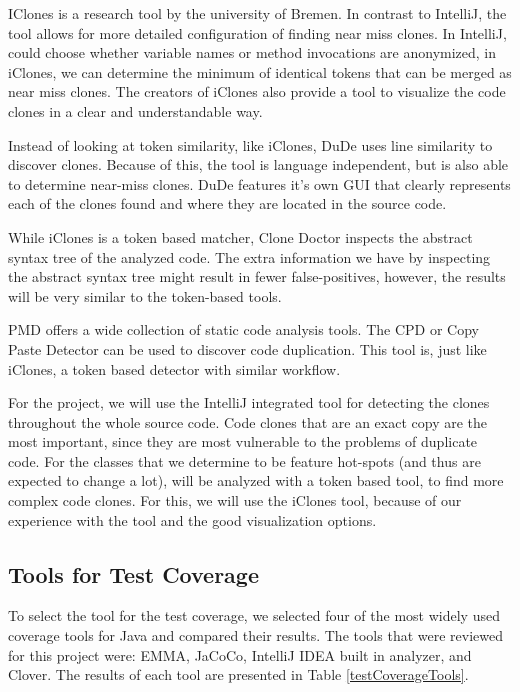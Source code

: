 \documentclass[]{article}
\begin{document}
IClones is a research tool by the university of Bremen. In contrast to IntelliJ, the tool allows for more detailed configuration of finding near miss clones. In IntelliJ, could choose whether variable names or method invocations are anonymized, in iClones, we can determine the minimum of identical tokens that can be merged as near miss clones. The creators of iClones also provide a tool to visualize the code clones in a clear and understandable way.

Instead of looking at token similarity, like iClones, DuDe uses line similarity to discover clones. Because of this, the tool is language independent, but is also able to determine near-miss clones. DuDe features it's own GUI that clearly represents each of the clones found and where they are located in the source code.

While iClones is a token based matcher, Clone Doctor inspects the abstract syntax tree of the analyzed code. The extra information we have by inspecting the abstract syntax tree might result in fewer false-positives, however, the results will be very similar to the token-based tools. 

PMD offers a wide collection of static code analysis tools. The CPD or Copy Paste Detector can be used to discover code duplication. This tool is, just like iClones, a token based detector with similar workflow. 

For the project, we will use the IntelliJ integrated tool for detecting the clones throughout the whole source code. Code clones that are an exact copy are the most important, since they are most vulnerable to the problems of duplicate code. For the classes that we determine to be feature hot-spots (and thus are expected to change a lot), will be analyzed with a token based tool, to find more complex code clones. For this, we will use the iClones tool, because of our experience with the tool and the good visualization options.





\subsection{Tools for Test Coverage}
To select the tool for the test coverage, we selected four of the most widely used coverage tools for Java and compared their results. The tools that were reviewed for this project were: EMMA, JaCoCo, IntelliJ IDEA built in analyzer, and Clover. The results of each tool are presented in Table \ref{testCoverageTools}.
\end{document}
